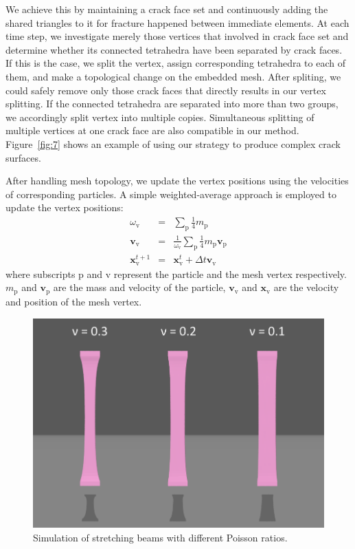 We achieve this by maintaining a crack face set and continuously adding the shared triangles to it for fracture happened between immediate elements.
At each time step, we investigate merely those vertices that involved in crack face set and determine whether its connected tetrahedra have been separated by crack faces.
If this is the case, we split the vertex, assign corresponding tetrahedra to each of them, and make a topological change on the embedded mesh.
After spliting, we could safely remove only those crack faces that directly results in our vertex splitting.
If the connected tetrahedra are separated into more than two groups, we accordingly split vertex into multiple copies.
Simultaneous splitting of multiple vertices at one crack face are also compatible in our method.
Figure~\ref{fig:7} shows an example of using our strategy to produce complex crack surfaces.

After handling mesh topology, we update the vertex positions using the velocities of corresponding particles.
A simple weighted-average approach is employed to update the vertex positions:
\begin{eqnarray}
\omega_{\mathrm{v}} &=& \sum_{\mathrm{p}} \frac{1}{4}m_{\mathrm{p}}\\
\textbf{v}_{\mathrm{v}} &=& \frac{1}{\omega_{\mathrm{v}}}\sum_{\mathrm{p}}\frac{1}{4}m_{\mathrm{p}}\textbf{v}_{\mathrm{p}}\\
\mathbf{x}_{\mathrm{v}}^{t+1} &=& \mathbf{x}_{\mathrm{v}}^{t} + \Delta t\textbf{v}_{\mathrm{v}}
\end{eqnarray}
where subscripts $\mathrm{p}$ and $\mathrm{v}$ represent the particle and the mesh vertex respectively.
$m_{\mathrm{p}}$ and $\textbf{v}_{\mathrm{p}}$ are the mass and velocity of the particle, $\textbf{v}_{\mathrm{v}}$ and $\textbf{x}_{\mathrm{v}}$ are the velocity and position of the mesh vertex.


\begin{figure}[t]
  \centering
  \includegraphics[width=\linewidth]{../figs/compare_different_poisson_ratio.png}
  \caption{\label{fig:8}
  Simulation of stretching beams with different Poisson ratios.
}
\end{figure}
